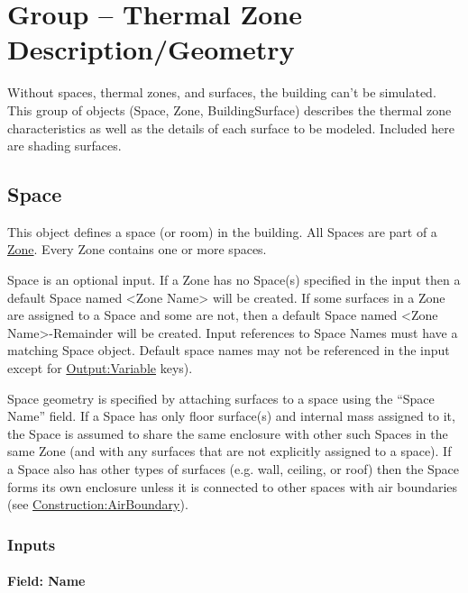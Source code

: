 \section{Group -- Thermal Zone Description/Geometry}\label{group-thermal-zone-description-geometry}

Without spaces, thermal zones, and surfaces, the building can't be simulated. This group of objects (Space, Zone, BuildingSurface) describes the thermal zone characteristics as well as the details of each surface to be modeled. Included here are shading surfaces.

\subsection{Space}\label{space}

This object defines a space (or room) in the building. All Spaces are part of a \hyperref[zone]{Zone}.
Every Zone contains one or more spaces.

Space is an optional input. If a Zone has no Space(s) specified in the input then a default Space named \textless{}Zone Name\textgreater{} will be created.
If some surfaces in a Zone are assigned to a Space and some are not, then a default Space
named \textless{}Zone Name\textgreater{}-Remainder will be created.
Input references to Space Names must have a matching Space object.
Default space names may not be referenced in the input except for \hyperref[outputvariable]{Output:Variable} keys).

Space geometry is specified by attaching surfaces to a space using the ``Space Name'' field. If a Space has only floor surface(s) and internal mass assigned to it, the Space is assumed to share the same enclosure with other such Spaces in the same Zone (and with any surfaces that are not explicitly assigned to a space). If a Space also has other types of surfaces (e.g. wall, ceiling, or roof) then the Space forms its own enclosure unless it is connected to other spaces with air boundaries (see \hyperref[constructionairboundary]{Construction:AirBoundary}).

\subsubsection{Inputs}\label{space-inputs-048}

\paragraph{Field: Name}\label{space-object-name}

